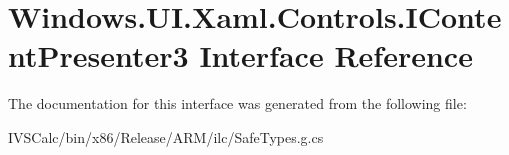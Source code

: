 \hypertarget{interface_windows_1_1_u_i_1_1_xaml_1_1_controls_1_1_i_content_presenter3}{}\section{Windows.\+U\+I.\+Xaml.\+Controls.\+I\+Content\+Presenter3 Interface Reference}
\label{interface_windows_1_1_u_i_1_1_xaml_1_1_controls_1_1_i_content_presenter3}


The documentation for this interface was generated from the following file\+:\begin{DoxyCompactItemize}
\item 
I\+V\+S\+Calc/bin/x86/\+Release/\+A\+R\+M/ilc/Safe\+Types.\+g.\+cs\end{DoxyCompactItemize}
